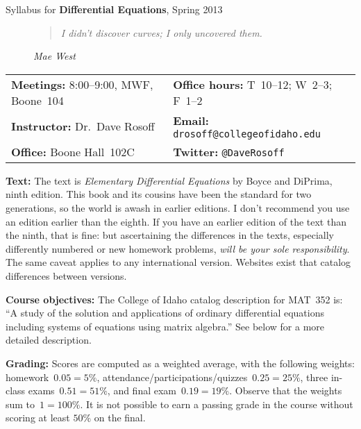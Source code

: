 \documentclass[11pt]{amsart}
\begin{document}
\thispagestyle{empty}
\begin{center}
    {\Large Syllabus for \textbf{Differential Equations}, Spring 2013}
\end{center}
\newcommand{\officehours}{T~10--12; W~2--3; F~1--2}

\begin{figure}[ht]
\centering
    \begin{minipage}{0.75\linewidth}
        \begin{quote}
            \emph{I didn't discover curves; I only uncovered them.}
        \end{quote}
        \begin{flushright}
            {\small\emph{Mae West}}
        \end{flushright}
    \end{minipage}
\end{figure}

\begin{tabularx}{\linewidth}{X@{\quad}X}
    \textbf{Meetings:} 8:00--9:00, MWF, Boone~104 
            & \textbf{Office hours:} \officehours \\
    \textbf{Instructor:} Dr.\ Dave Rosoff 
            & \textbf{Email:} \nolinkurl{drosoff@collegeofidaho.edu} \\
    \textbf{Office:} Boone Hall~102C 
            & \textbf{Twitter:} \nolinkurl{@DaveRosoff}
\end{tabularx}

\textbf{Text:} The text is \emph{Elementary Differential Equations} by Boyce and DiPrima, ninth edition. This book and its cousins have been the standard for two generations, so the world is awash in earlier editions. I don't recommend you use an edition earlier than the eighth. If you have an earlier edition of the text than the ninth, that is fine: but ascertaining the differences in the texts, especially differently numbered or new homework problems, \emph{will be your sole responsibility}. The same caveat applies to any international version. Websites exist that catalog differences between versions.

\textbf{Course objectives:} The College of Idaho catalog description for MAT~352 is: ``A study of the solution and applications of ordinary differential equations including systems of equations using matrix algebra.'' See below for a more detailed description.

\textbf{Grading:} Scores are computed as a weighted average, with the following weights: homework~$0.05 = 5\%$, attendance/participations/quizzes~$0.25 = 25\%$, three in-class exams~$0.51 = 51\%$, and final exam~$0.19 = 19\%$. Observe that the weights sum to~$1 = 100\%$. It is not possible to earn a passing grade in the course without scoring at least $50\%$ on the final.
\end{document}
